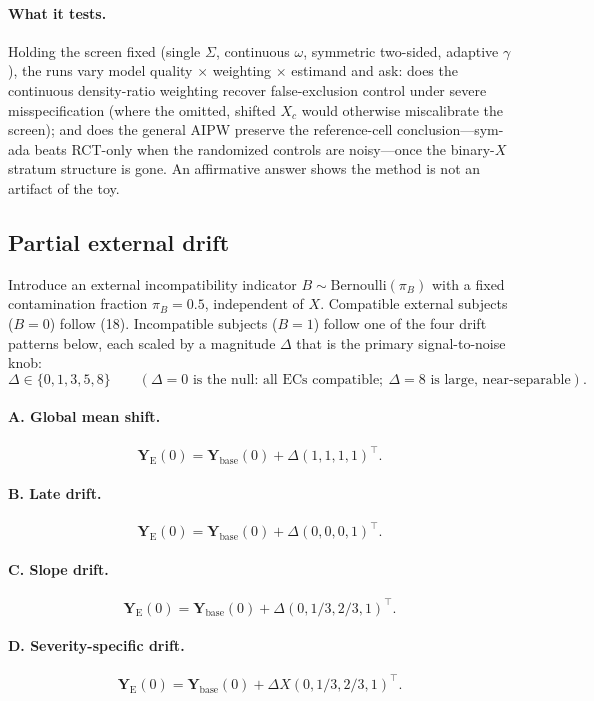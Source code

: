 \documentclass[11pt]{article}
\newcommand{\E}{\mathrm{E}}
\begin{document}
\paragraph{What it tests.} Holding the screen fixed (single $\Sigma$, continuous $\omega$, symmetric two-sided, adaptive $\gamma$), the runs vary model quality $\times$ weighting $\times$ estimand and ask: does the continuous density-ratio weighting recover false-exclusion control under severe misspecification (where the omitted, shifted $X_c$ would otherwise miscalibrate the screen); and does the general AIPW preserve the reference-cell conclusion---sym-ada beats RCT-only when the randomized controls are noisy---once the binary-$X$ stratum structure is gone. An affirmative answer shows the method is not an artifact of the toy.

\subsection{Partial external drift}

Introduce an external incompatibility indicator $B\sim\mathrm{Bernoulli}(\pi_B)$ with a fixed contamination fraction $\pi_B=0.5$, independent of $X$. Compatible external subjects ($B=0$) follow (18). Incompatible subjects ($B=1$) follow one of the four drift patterns below, each scaled by a magnitude $\Delta$ that is the primary signal-to-noise knob:
\[
\Delta\in\{0,1,3,5,8\}
\qquad
(\Delta=0\text{ is the null: all ECs compatible};\ \Delta=8\text{ is large, near-separable}).
\tag{28}
\]

\paragraph{A. Global mean shift.}
\[
\bm Y_{\E}(0)=\bm Y_{\mathrm{base}}(0)+\Delta(1,1,1,1)^{\top}.
\tag{29}
\]

\paragraph{B. Late drift.}
\[
\bm Y_{\E}(0)=\bm Y_{\mathrm{base}}(0)+\Delta(0,0,0,1)^{\top}.
\tag{30}
\]

\paragraph{C. Slope drift.}
\[
\bm Y_{\E}(0)=\bm Y_{\mathrm{base}}(0)+\Delta(0,1/3,2/3,1)^{\top}.
\tag{31}
\]

\paragraph{D. Severity-specific drift.}
\[
\bm Y_{\E}(0)=\bm Y_{\mathrm{base}}(0)+\Delta X(0,1/3,2/3,1)^{\top}.
\tag{32}
\]
\end{document}
